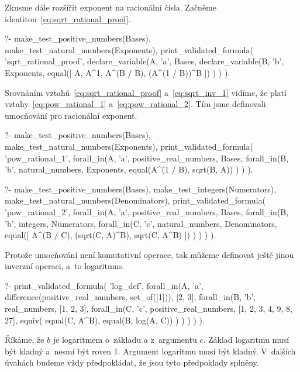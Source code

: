 Zkusme dále rozšířit exponent na racionální čísla. Začněme identitou~\eqref{eq:sqrt_rational_proof}.

\begin{prolog}
?-	make_test_positive_numbers(Bases),
	make_test_natural_numbers(Exponents),
	print_validated_formula(
		'sqrt_rational_proof',
		declare_variable(A, 'a', Bases,
			declare_variable(B, 'b', Exponents,
				equal([
					A,
					A^1,
					A^(B / B),
					(A^(1 / B))^B
				])
			)
		)
	).				
\end{prolog}

Srovnáním vztahů~\eqref{eq:sqrt_rational_proof} a~\eqref{eq:sqrt_inv_1} vidíme, že platí vztahy~\eqref{eq:pow_rational_1} a~\eqref{eq:pow_rational_2}. Tím jsme definovali umocňování pro racionální exponent.

\begin{fact}
\begin{prolog}
?-	make_test_positive_numbers(Bases),
	make_test_natural_numbers(Exponents),
	print_validated_formula(
		'pow_rational_1',
		forall_in(A, 'a', positive_real_numbers, Bases,
			forall_in(B, 'b', natural_numbers, Exponents,
				equal(A^(1 / B), sqrt(B, A))
			)
		)
	).				
\end{prolog}
\begin{prolog}
?-	make_test_positive_numbers(Bases),
	make_test_integers(Numerators),
	make_test_natural_numbers(Denominators),
	print_validated_formula(
		'pow_rational_2',
		forall_in(A, 'a', positive_real_numbers, Bases,
			forall_in(B, 'b', integers, Numerators,
				forall_in(C, 'c', natural_numbers, Denominators,
					equal([
						A^(B / C),
						(sqrt(C, A)^B),
						sqrt(C, A^B)
					])
				)
			)
		)
	).				
\end{prolog}
\end{fact}

Protože umocňování není komutativní operace, tak můžeme definovat ještě jinou inverzní operaci, a~to logaritmus.

\begin{prolog}
?-	print_validated_formula(
		'log_def',
		forall_in(A, 'a', difference(positive_real_numbers, set_of([1])), [2, 3],
			forall_in(B, 'b', real_numbers, [1, 2, 3],
				forall_in(C, 'c', positive_real_numbers, [1, 2, 3, 4, 9, 8, 27],
					equiv(
						equal(C, A^B),
						equal(B, log(A, C))
					)
				)
			)
		)
	).				
\end{prolog}

Říkáme, že \(b\) je logaritmem o~základu \(a\) z~argumentu \(c\). Základ logaritmu musí být kladný a~nesmí být roven 1. Argument logaritmu musí být kladný. V~dalších úvahách budeme vždy předpokládat, že jsou tyto předpoklady splněny.

